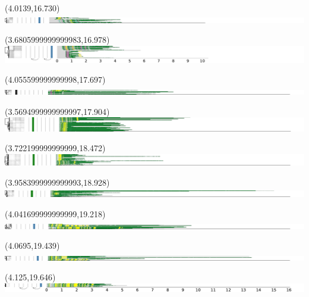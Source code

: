 \documentclass{article}
\begin{document}
\begin{textblock}{13}(4.0139,16.730)\includegraphics{haplotypes-constrained/chr11-HG006.pdf}\end{textblock}
\begin{textblock}{13}(3.6805999999999983,16.978)\includegraphics{haplotypes-constrained/chr11-HG007.pdf}\end{textblock}
\begin{textblock}{13}(4.055599999999998,17.697)\includegraphics{haplotypes-constrained/chr12-HG001.pdf}\end{textblock}
\begin{textblock}{13}(3.5694999999999997,17.904)\includegraphics{haplotypes-constrained/chr12-HG002.pdf}\end{textblock}
\begin{textblock}{13}(3.722199999999999,18.472)\includegraphics{haplotypes-constrained/chr12-HG003.pdf}\end{textblock}
\begin{textblock}{13}(3.9583999999999993,18.928)\includegraphics{haplotypes-constrained/chr12-HG004.pdf}\end{textblock}
\begin{textblock}{13}(4.041699999999999,19.218)\includegraphics{haplotypes-constrained/chr12-HG005.pdf}\end{textblock}
\begin{textblock}{13}(4.0695,19.439)\includegraphics{haplotypes-constrained/chr12-HG006.pdf}\end{textblock}
\begin{textblock}{13}(4.125,19.646)\includegraphics{haplotypes-constrained/chr12-HG007.pdf}\end{textblock}
\end{document}
